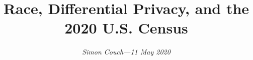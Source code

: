 \documentclass[12pt]{article}
\begin{document}
\makeatletter
\renewcommand\section{\@startsection {section}{1}{\z@}%
                                   {-1.5ex\@plus -1ex \@minus -.2ex}%
                                   {.75ex \@plus .2ex}%
                                   {\normalfont\normalsize\bfseries}}%
\renewcommand\subsection{\@startsection{subsection}{2}{\z@}%
                                   {-1.0ex\@plus -1ex \@minus -.2ex}%
                                   {.5ex \@plus .2ex}%
                                   {\normalfont\normalsize\itshape}}%
\makeatother


\title{\vspace{-10pt} Race, Differential Privacy, and the 2020 U.S. Census}
       
\author{\textit{Simon Couch—11 May 2020}}

\date{}

\maketitle

\doublespace







\clearpage




\clearpage

\appendix

\end{document}
